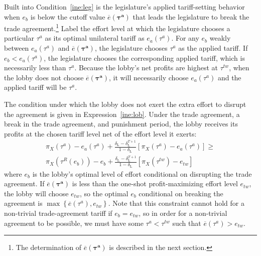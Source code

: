 \documentclass[authoryear, review]{elsarticle}
\newcommand{\ov}{\overline}
\newcommand{\bta}{\bm{\tau^a}}
\newcommand{\de}{\delta}
\begin{document}
Built into Condition~\ref{ine:leg} is the legislature's applied tariff-setting behavior when $e_b$ is below the cutoff value $\ov{e}(\bta)$ that leads the legislature to break the trade agreement.\footnote{The determination of $\ov{e}(\bta)$ is described in the next section.} Label the effort level at which the legislature chooses a particular $\tau^a$ as its optimal unilateral tariff as $e_a(\tau^a)$. For any $e_b$ weakly between $e_a(\tau^a)$ and $\ov{e}(\bta)$, the legislature chooses $\tau^a$ as the applied tariff. If $e_b < e_a(\tau^a)$, the legislature chooses the corresponding applied tariff, which is necessarily less than $\tau^a$. Because the lobby's net profits are highest at $\tau^{tw}$, when the lobby does not choose $\ov{e}(\bta)$, it will necessarily choose $e_a(\tau^a)$ and the applied tariff will be $\tau^a$.

The condition under which the lobby does not exert the extra effort to disrupt the agreement is given in Expression~\ref{ine:lob}. Under the trade agreement, a break in the trade agreement, and punishment period, the lobby receives its profits at the chosen tariff level net of the effort level it exerts:
\begin{multline}
  \pi_X(\tau^a) - e_a(\tau^a) + \frac{\de_\text{L} - \de_\text{L}^{T+1}}{1-\de_\text{L}} \left[\pi_X(\tau^a) - e_a(\tau^a) \right] \geq \\ \pi_X(\tau^R(e_b)) - e_b + \frac{\de_\text{L} - \de_\text{L}^{T+1}}{1-\de_\text{L}} \left[\pi_X(\tau^{tw}) - e_{tw} \right]
  \label{ine:lob}
\end{multline}
where $e_b$ is the lobby's optimal level of effort conditional on disrupting the trade agreement. If $\ov{e}(\bta)$ is less than the one-shot profit-maximizing effort level $e_{tw}$, the lobby will choose $e_{tw}$, so the optimal $e_b$ conditional on breaking the agreement is $\max \left\{\ov{e}(\tau^a), e_{tw}\right\}$. Note that this constraint cannot hold for a non-trivial trade-agreement tariff if $e_b = e_{tw}$, so in order for a non-trivial agreement to be possible, we must have some $\tau^a< \tau^{tw}$ such that $\ov{e}(\tau^a) > e_{tw}$.
\end{document}
